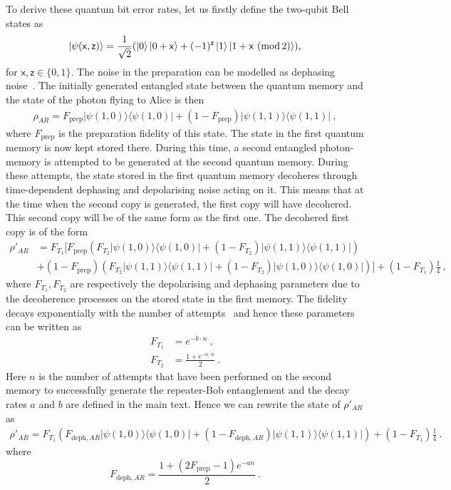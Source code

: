 \documentclass[aps,pra,reprint,superscriptaddress]{revtex4-1}
\newcommand{\san}[1]{\mathsf{#1}}
\newcommand{\proj}[1]{|#1\rangle\langle#1|}
\begin{document}
To derive these quantum bit error rates, let us firstly define the two-qubit Bell states as
\begin{eqnarray}
\ket{\psi(\san{x},\san{z})} =
\frac{1}{\sqrt{2}}(
\ket{0}\ket{0 + \san{x}} + (-1)^{\san{z}}
\ket{1} \ket{1 + \san{x}\,\,(\textrm{mod} \, 2)}
),
\end{eqnarray}
for $\san{x},\san{z} \in \{0,1\}$.
The noise in the preparation can be modelled as dephasing noise~\cite{togan2010quantum}. The initially generated entangled state between the quantum memory and the state of the photon flying to Alice is then
\begin{align}
\rho_{AR} = F_{\textrm{prep}} \proj{\psi(1,0)} + (1-F_{\textrm{prep}})\proj{\psi(1,1)}\ ,
\end{align}
where $F_{\textrm{prep}}$ is the preparation fidelity of this state. The state in the first quantum memory is now kept stored there. During this time, a second entangled photon-memory is attempted to be generated at the second quantum memory. During these attempts, the state stored in the first quantum memory decoheres through time-dependent dephasing and depolarising noise acting on it. This means that at the time when the second copy is generated, the first copy will have decohered. This second copy will be of the same form as the first one. The decohered first copy is of the form
\begin{align}
\rho'_{AR}	&= F_{T_1} [F_{\textrm{prep}} (F_{T_2} \proj{\psi(1,0)} + (1 - F_{T_2})\proj{\psi(1,1)}) \\
		&+ (1-F_{\textrm{prep}})\left(F_{T_2} \proj{\psi(1,1)} + (1 - F_{T_2}) \proj{\psi(1,0)}\right)] + (1 - F_{T_1}) \frac{\mathbb{I}}{4}\ , \nonumber
\end{align}
where $F_{T_1}, F_{T_2}$ are respectively the depolarising and dephasing parameters due to the decoherence processes on the stored state in the first memory. The fidelity decays exponentially with the number of attempts~\cite{reiserer2016robust} and hence these parameters can be written as
\begin{align}
F_{T_1}	&= e^{-b\cdot n}\ ,\\
F_{T_2}	&= \frac{1 + e^{-a\cdot n}}{2}\ .
\end{align}
Here $n$ is the number of attempts that have been performed on the second memory to successfully generate the repeater-Bob entanglement and the decay rates $a$ and $b$ are defined in the main text.
Hence we can rewrite the state of $\rho'_{AR}$ as
\begin{align}
\rho'_{AR} = F_{T_1} (F_{\textrm{deph},AR} \proj{\psi(1,0)} + (1 - F_{\textrm{deph},AR}) \proj{\psi(1,1)}) + (1 - F_{T_1}) \frac{\mathbb{I}}{4}\ .
\end{align}
where 
\begin{equation}
F_{\textrm{deph},AR} = \frac{1 + (2 F_{\textrm{prep}} - 1) e^{-a n}}{2}\ .
\end{equation}
\end{document}
